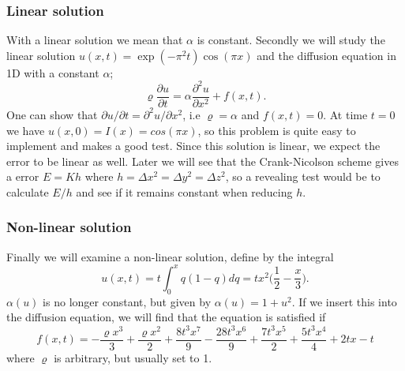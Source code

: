 \documentclass[norsk,a4paper,12pt]{article}
\begin{document}
\subsubsection{Linear solution}
With a linear solution we mean that $\alpha$ is constant. Secondly we will study the linear solution $u(x,t) = \exp(-\pi^2 t)\cos(\pi x)$ and the diffusion equation in 1D with a constant $\alpha$;
\begin{equation}
\varrho\frac{\partial u}{\partial t}=\alpha\frac{\partial^2 u}{\partial x^2}+f(x,t).
\end{equation}
One can show that $\partial u/\partial t=\partial^2 u/\partial x^2$, i.e $\varrho=\alpha$ and $f(x,t)=0$. At time $t=0$ we have $u(x,0)=I(x)=cos(\pi x)$, so this problem is quite easy to implement and makes a good test. Since this solution is linear, we expect the error to be linear as well. Later we will see that the Crank-Nicolson scheme gives a error $E=Kh$ where $h=\Delta x^2 = \Delta y^2 = \Delta z^2$, so a revealing test would be to calculate $E/h$ and see if it remains constant when reducing $h$. 

\subsubsection{Non-linear solution}
Finally we will examine a non-linear solution, define by the integral
\begin{equation}
u(x,t) = t\int_0^xq(1-q)dq = tx^2\bigg(\frac{1}{2}-\frac{x}{3}\bigg).
\end{equation}
$\alpha(u)$ is no longer constant, but given by $\alpha(u)=1+u^2$. If we insert this into the diffusion equation, we will find that the equation is satisfied if
\begin{equation}
f(x,t)=-\frac{\varrho x^3}{3} + \frac{\varrho x^2}{2} + \frac{8t^3x^7}{9}-\frac{28t^3x^6}{9}+\frac{7t^3x^5}{2}+\frac{5t^3x^4}{4}+2tx-t
\end{equation}
where $\varrho$ is arbitrary, but usually set to 1.
\end{document}
